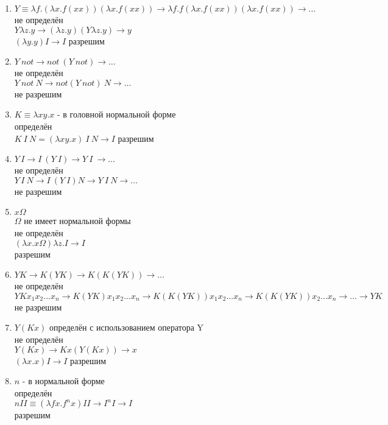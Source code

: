 \documentclass[10pt,a4paper]{article}
\begin{document}
\begin{enumerate}
\item
$Y \equiv \lambda f.(\lambda x.f(xx))(\lambda x.f(xx)) \rightarrow
\lambda f.f(\lambda x.f(xx))(\lambda x.f(xx)) \rightarrow \ldots $\\
не определён \\
$Y\lambda z.y \rightarrow (\lambda z.y)(Y\lambda z.y) \rightarrow y $ \\
$(\lambda y.y)I \rightarrow I$
разрешим 
\item
$Y\ not \rightarrow not\ ( Y\ not) \rightarrow \ldots$ \\
не определён \\
$Y\ not\ N \rightarrow not(Y\ not)\ N \rightarrow \ldots $ \\
не разрешим
\item
$K \equiv \lambda xy.x$ - в головной нормальной форме\\
определён \\
$K\ I\ N= (\lambda xy.x)\ I\ N \rightarrow I$
разрешим
\item
$Y\,I \rightarrow I\ (Y\ I) \rightarrow Y\ I\ \rightarrow \ldots$\\
не определён \\
$Y\,I\ N \rightarrow I\ (Y\ I) N \rightarrow Y\ I\ N \rightarrow \ldots$\\
не разрешим
\item
$x \Omega $ \\
$\Omega$ не имеет нормальной формы\\
не определён \\
$(\lambda x.x \Omega)\lambda z.I \rightarrow I $ \\
разрешим
\item
$YK \rightarrow K(YK) \rightarrow K(K(YK)) \rightarrow \ldots  $\\
не определён \\
$YK x_1x_2...x_n \rightarrow 
K(YK) x_1x_2...x_n \rightarrow 
K(K(YK)) x_1x_2...x_n  \rightarrow  
K(K(YK)) x_2...x_n  \rightarrow
\ldots \rightarrow
YK
$\\
не разрешим
\item
$Y(Kx)$ определён с использованием оператора Y\\
не определён \\
$Y(Kx) \rightarrow Kx(Y(Kx)) \rightarrow x$\\
$(\lambda x.x)I \rightarrow I$
разрешим
\item
$n$ - в нормальной форме \\
определён \\
$nII \equiv (\lambda fx.f^nx)II \rightarrow I^nI \rightarrow I $ \\
разрешим

\end{enumerate}
\end{document}
